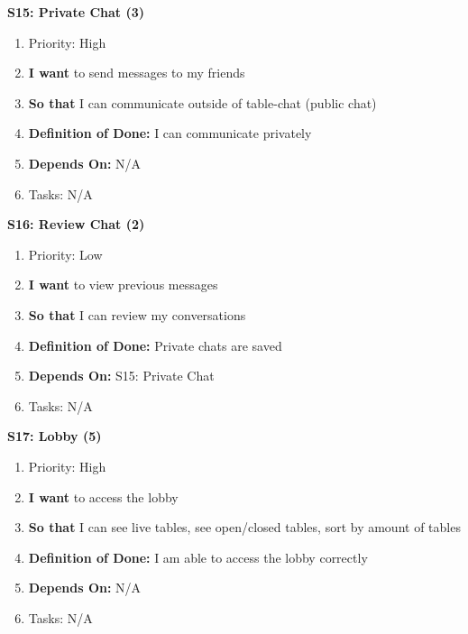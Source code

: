 \textbf{S15: Private Chat (3)}
\begin{enumerate}
    \item Priority: High
    \item \textbf{I want} to send messages to my friends
    \item \textbf{So that} I can communicate outside of table-chat (public chat)
    \item \textbf{Definition of Done:} I can communicate privately
    \item \textbf{Depends On:} N/A
    \item Tasks: N/A
\end{enumerate}


\textbf{S16: Review Chat (2)}
\begin{enumerate}
    \item Priority: Low
    \item \textbf{I want} to view previous messages
    \item \textbf{So that} I can review my conversations
    \item \textbf{Definition of Done:} Private chats are saved
    \item \textbf{Depends On:} S15: Private Chat
    \item Tasks: N/A
\end{enumerate}


\textbf{S17: Lobby (5)}
\begin{enumerate}
    \item Priority: High
    \item \textbf{I want} to access the lobby 
    \item \textbf{So that} I can see live tables, see open/closed tables, sort by amount of tables
    \item \textbf{Definition of Done:} I am able to access the lobby correctly
    \item \textbf{Depends On:} N/A
    \item Tasks: N/A
\end{enumerate}


